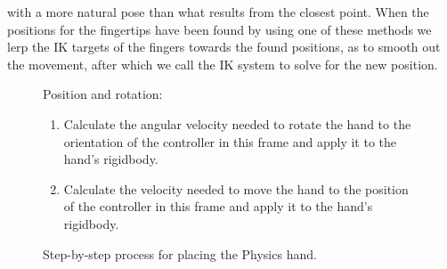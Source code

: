 with a more natural pose than what results from the closest point. When the positions for the fingertips have been found by using one of these methods we lerp the IK targets of the fingers towards the found positions, as to smooth out the movement, after which we call the IK system to solve for the new position.


\begin{figure}[H]
\centering
\small
\begin{flushleft}
Position and rotation:
\end{flushleft}
\begin{enumerate}[noitemsep]
\item Calculate the angular velocity needed to rotate the hand to the orientation of the controller in this frame and apply it to the hand's rigidbody.
\item Calculate the velocity needed to move the hand to the position of the controller in this frame and apply it to the hand's rigidbody.
\end{enumerate}
\caption{Step-by-step process for placing the Physics hand.}
\label{fig:stepByStepPhysicsHandPositionRotation}
\end{figure}

